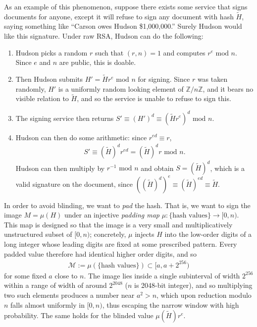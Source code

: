 \documentclass[12pt,reqno]{amsart}
\theoremstyle{definition}
\newcommand{\bbZ}{{\mathbb{Z}}}
\newcommand{\cM}{\mathcal{M}}
\renewcommand{\mod}{\text{ mod }}
\begin{document}
\begin{enumerate}[label=\arabic*.]
    As an example of this phenomenon, suppose there exists some service that signs documents for anyone, except it will refuse to sign any document with hash $\tilde H$, saying something like ``Carson owes Hudson \$1,000,000.'' Surely Hudson would like this signature. Under raw RSA, Hudson can do the following:
    \begin{enumerate}[label=\roman*.]
        \item Hudson picks a random $r$ such that $(r,n)=1$ and computes $r^e\mod n$. Since $e$ and $n$ are public, this is doable. 
        \item Then Hudson submits $H'=\tilde H r^e\mod n$ for signing. Since $r$ was taken randomly, $H'$ is a uniformly random looking element of $\bbZ/n\bbZ$, and it bears no visible relation to $\tilde H$, and so the service is unable to refuse to sign this. 
        \item The signing service then returns $S'\equiv (H')^d\equiv(\tilde H r^e)^d\mod n$. 
        \item Hudson can then do some arithmetic: since $r^{ed}\equiv r$,
        \begin{align*}
            S'\equiv (\tilde H)^d r^{ed}=(\tilde H)^dr\mod n.
        \end{align*} Hudson can then multiply by $r^{-1}\mod n$ and obtain $S=(\tilde H)^d$, which is a valid signature on the document, since $((\tilde H)^d)^e\equiv (\tilde H)^{ed}\equiv\tilde H$.
    \end{enumerate}

    In order to avoid blinding, we want to \textit{pad} the hash. That is, we want to sign the image $M=\mu(H)$ under an injective \textit{padding map} $\mu:\{\text{hash values}\}\to[0,n)$. This map is designed so that the image is a very small and multiplicatively unstructured subset of $[0,n)$; concretely, $\mu$ injects $H$ into the low-order digits of a long integer whose leading digits are fixed at some prescribed pattern. Every padded value therefore had identical higher order digits, and so
    \begin{align*}
        \cM:=\mu(\{\text{hash values}\})\subset[a,a+2^{256})
    \end{align*} for some fixed $a$ close to $n$. The image lies inside a single subinterval of width $2^{256}$ within a range of width of around $2^{2048}$ ($n$ is 2048-bit integer), and so multiplying two such elements produces a number near $a^2>n$, which upon reduction modulo $n$ falls almost uniformly in $[0,n)$, thus escaping the narrow window with high probability. The same holds for the blinded value $\mu(\tilde H)r^e$.


\end{enumerate}
\end{document}
